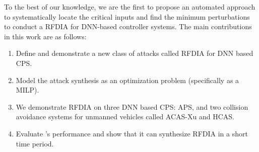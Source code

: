 To the best of our knowledge, we are the first to  propose an automated approach to systematically locate the critical inputs and find the minimum perturbations to conduct a \ac{RFDIA} for DNN-based controller systems.
The main contributions in this work are as follows:
\begin{enumerate}
	\item Define and demonstrate a new class of attacks called \ac{RFDIA} for \ac{DNN} based \ac{CPS}. 
	\item Model the attack synthesis as an optimization problem (specifically as a MILP). %
	
	\item We demonstrate \ac{RFDIA} on three \ac{DNN} based \ac{CPS}: \ac{APS},  and  two collision avoidance systems for unmanned vehicles called \ac{ACAS-Xu} and \ac{HCAS}.
	
	\item Evaluate \tool's performance and show that it can synthesize \ac{RFDIA} in a short time period.   %
\end{enumerate}

